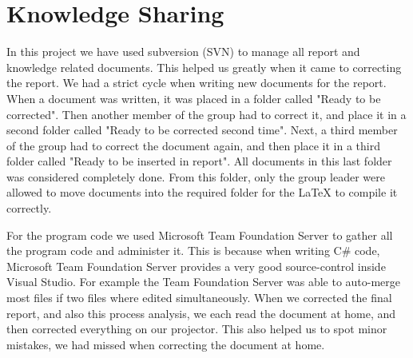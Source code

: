 \section{Knowledge Sharing}
In this project we have used subversion (SVN) to manage all report and knowledge related documents. This helped us greatly when it came to correcting the report. We had a strict cycle when writing new documents for the report. When a document was written, it was placed in a folder called "Ready to be corrected". Then another member of the group had to correct it, and place it in a second folder called "Ready to be corrected second time". Next, a third member of the group had to correct the document again, and then place it in a third folder called "Ready to be inserted in report". All documents in this last folder was considered completely done. From this folder, only the group leader were allowed to move documents into the required folder for the LaTeX to compile it correctly.

For the program code we used Microsoft Team Foundation Server to gather all the program code and administer it. This is because when writing C\# code, Microsoft Team Foundation Server provides a very good source-control inside Visual Studio. For example the Team Foundation Server was able to auto-merge most files if two files where edited simultaneously. When we corrected the final report, and also this process analysis, we each read the document at home, and then corrected everything on our projector. This also helped us to spot minor mistakes, we had missed when correcting the document at home.